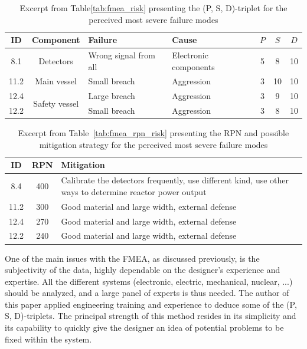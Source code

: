 \begin{table}[!htb]
    \centering
        \begin{tabular}{ccp{4cm}p{4cm}ccc}
            \hline
            ID & Component & Failure & Cause & $P$ & $S$ & $D$ \\ \hline \hline
            8.1 & \multirow{1}{3cm}{Detectors}  & Wrong signal from all & Electronic components & 5 & 8 & 10 \\ \hline
            11.2 & \multirow{1}{3cm}{Main vessel} & Small breach & Aggression & 3 & 10 & 10 \\ \hline
            12.4 & \multirow{2}{3cm}{Safety vessel}  & Large breach & Aggression & 3 & 9 & 10 \\ 
            12.2 &                                   & Small breach & Aggression & 3 & 8 & 10 \\
        \end{tabular}
        \caption{Excerpt from Table\ref{tab:fmea_risk} presenting the (P, S, D)-triplet for the perceived most severe failure modes}\label{tab:excerpt_fmea}
\end{table}


\begin{table}[!htb]
    \centering
        \begin{tabular}{ccp{10cm}}
            \hline
            ID & RPN & Mitigation \\ \hline\hline
            8.4 & 400  & Calibrate the detectors frequently, use different kind, use other ways to determine reactor power output \\
            11.2 & 300 & Good material and large width, external defense \\
            12.4 & 270 & Good material and large width, external defense \\
            12.2 & 240 & Good material and large width, external defense \\
        \end{tabular}
        \caption{Excerpt from Table~\ref{tab:fmea_rpn_risk} presenting the RPN and possible mitigation strategy for the perceived most severe failure modes}\label{tab:excerpt_rpn_fmea}
\end{table}

One of the main issues with the FMEA, as discussed previously, is the subjectivity of the data, highly dependable on the designer's experience and expertise. All the different systems (electronic, electric, mechanical, nuclear, ...) should be analyzed, and a large panel of experts is thus needed. The author of this paper applied engineering training and experience to deduce some of the (P, S, D)-triplets. The principal strength of this method resides in its simplicity and its capability to quickly give the designer an idea of potential problems to be fixed within the system.

